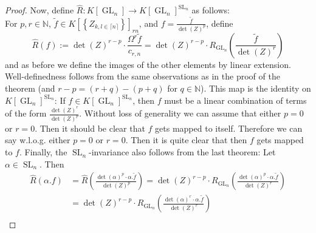 \begin{proof}
  Now, define $\hat{R} \colon K \left\lbrack \operatorname{GL}_n \right\rbrack \longrightarrow K \left\lbrack \operatorname{GL}_n \right\rbrack ^{\operatorname{SL}_n} $ as follows: \\
  For $ p,r \in \mathbb{N} $, $ \tilde{f} \in K \left\lbrack \left\lbrace Z_{k,l \in \lceil n \rceil} \right\rbrace \right\rbrack_{rn} $, and $ f = \frac{\tilde{f}}{\operatorname{det} (Z)^p } $, define
  \begin{equation}
    \hat{R} (f) := \operatorname{det} (Z)^{r-p} \cdot \frac{ \Omega^r \tilde{f} }{ c_{r,n} }
    = \operatorname{det} (Z)^{r-p} \cdot R_{\operatorname{GL}_n} \left( \frac{\tilde{f}}{\operatorname{det} (Z) ^r} \right)
  \end{equation}
  and as before we define the images of the other elements by linear extension.
  Well-definedness follows from the same observations as in the proof of the theorem (and $ r-p = (r+q)-(p+q) $ for $ q \in \mathbb{N} $).
  This map is the identity on $ K \left\lbrack \operatorname{GL}_n \right\rbrack ^{\operatorname{SL}_n }$:
  If $f \in K[\operatorname{GL}_n]^{\operatorname{SL}_n}$, then $f$ must be a linear combination of terms of the form $\frac{\operatorname{det}(Z)^r}{\operatorname{det}(Z)^p}$.
  Without loss of generality we can assume that either $p=0$ or $r=0$.
  Then it should be clear that $f$ gets mapped to itself.
  Therefore we can say w.l.o.g. either $p=0$ or $r=0$.
  Then it is quite clear that then $f$ gets mapped to $f$.
  Finally, the $\operatorname{SL}_n$-invariance also follows from the last theorem: Let $\alpha \in \operatorname{SL}_n$.
  Then
  \begin{equation}
    \begin{aligned}
      \hat{R} (\alpha . f)
      &= \hat{R} \left( \frac{ \operatorname{det} (\alpha)^p \cdot \alpha . \tilde{f} }{ \operatorname{det} (Z)^p } \right) 
      = \operatorname{det} (Z)^{r-p} \cdot R_{\operatorname{GL}_n} \left( \frac{ \operatorname{det} (\alpha)^p \cdot \alpha . \tilde{f} }{ \operatorname{det}(Z)^r } \right) \\
      &= \operatorname{det} (Z)^{r-p} \cdot R_{\operatorname{GL}_n} \left( \frac{ \operatorname{det} (\alpha)^r \cdot \alpha . \tilde{f} }{ \operatorname{det}(Z)^r } \right) \\

\end{aligned}
\end{equation}
\end{proof}
